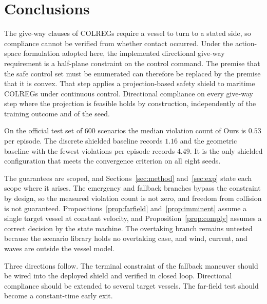 \documentclass[10pt,letterpaper]{article}
\begin{document}
\section{Conclusions}
\label{sec:conclusions}

The give-way clauses of COLREGs require a vessel to turn to a stated side, so compliance
cannot be verified from whether contact occurred. Under the action-space formulation
adopted here, the implemented directional give-way requirement is a half-plane
constraint on the control command. The premise that the safe control set must be enumerated can therefore be replaced by
the premise that it is convex. That step applies a projection-based safety shield to
maritime COLREGs under continuous control. Directional
compliance on every give-way step where the projection is feasible holds by
construction, independently of the training outcome and of the seed. 

On the official test set of $600$ scenarios the median violation count of Ours is $0.53$
per episode. The discrete shielded baseline records $1.16$ and the geometric baseline with the fewest violations per episode records $4.49$. It is the only shielded configuration that meets the
convergence criterion on all eight seeds.

The guarantees are scoped, and Sections~\ref{sec:method} and~\ref{sec:exp} state
each scope where it arises. The emergency and fallback branches bypass the constraint by
design, so the measured violation count is not zero, and freedom from collision is not
guaranteed. Propositions~\ref{prop:farfield} and~\ref{prop:imminent}
assume a single target vessel at constant velocity, and Proposition~\ref{prop:comply}
assumes a correct decision by the state machine. The overtaking branch remains untested
because the scenario library holds no overtaking case, and wind, current, and waves are
outside the vessel model.

Three directions follow. The terminal constraint of the fallback maneuver should be
wired into the deployed shield and verified in closed loop. Directional compliance
should be extended to several target vessels. The far-field test should become a
constant-time early exit.

\end{document}
